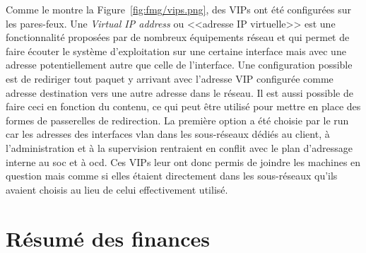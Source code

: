 \documentclass[12pt, oneside, a4paper, titlepage]{report}
\begin{document}
Comme le montre la Figure~\ref{fig:fmg/vips.png}, des VIPs ont été configurées
sur les pares-feux. Une \textit{Virtual IP address} ou <<adresse IP virtuelle>>
est une fonctionnalité proposées par de nombreux équipements réseau et qui
permet de faire écouter le système d'exploitation sur une certaine interface
mais avec une adresse potentiellement autre que celle de l'interface. Une
configuration possible est de rediriger tout paquet y arrivant avec l'adresse
VIP configurée comme adresse destination vers une autre adresse dans le réseau.
Il est aussi possible de faire ceci en fonction du contenu, ce qui peut être
utilisé pour mettre en place des formes de passerelles de redirection. La
première option a été choisie par le \gls{run} car les adresses des interfaces
\gls{vlan} dans les sous-réseaux dédiés au client, à l'administration et à la
supervision rentraient en conflit avec le plan d'adressage interne au \gls{soc}
et à \gls{ocd}. Ces VIPs leur ont donc permis de joindre les machines en
question mais comme si elles étaient directement dans les sous-réseaux qu'ils
avaient choisis au lieu de celui effectivement utilisé.

\section{Résumé des finances}%
\label{sec:annexes::finances-ocd}
\end{document}
